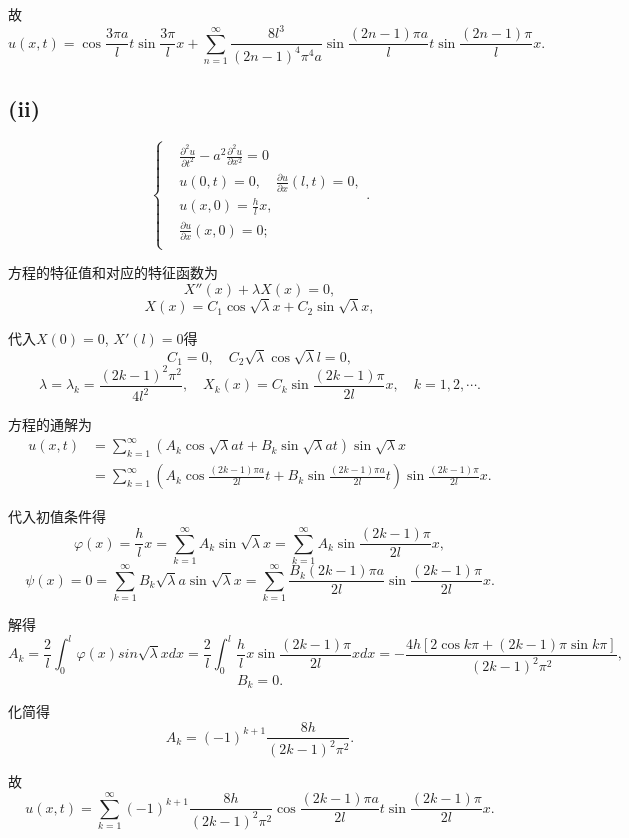 \documentclass[11pt,a4paper]{article}
\begin{document}
故
$$u(x,t)=\cos\frac{3\pi a}{l}t\sin\frac{3\pi}{l}x+\sum_{n=1}^\infty\frac{8l^3}{(2n-1)^4\pi^4a}\sin\frac{(2n-1)\pi a}{l}t\sin\frac{(2n-1)\pi}{l}x.$$

\subsection*{(ii)}

$$
  \left\{\begin{aligned}
     & \frac{\partial^2u}{\partial t^2}-a^2\frac{\partial^2u}{\partial x^2}=0 \\
     & u(0,t)=0,\quad \frac{\partial u}{\partial x}(l,t)=0,                   \\
     & u(x,0)=\frac{h}{l}x,                                                   \\
     & \frac{\partial u}{\partial x}(x,0)=0;                                  \\
  \end{aligned}\right..
$$

方程的特征值和对应的特征函数为
$$X''(x)+\lambda X(x)=0,$$
$$X(x)=C_1\cos\sqrt{\lambda}x+C_2\sin\sqrt{\lambda}x,$$

代入$X(0)=0$, $X'(l)=0$得
$$C_1=0,\quad C_2\sqrt{\lambda}\cos\sqrt{\lambda}l=0,$$
$$\lambda=\lambda_k=\frac{(2k-1)^2\pi^2}{4l^2},\quad X_k(x)=C_k\sin\frac{(2k-1)\pi}{2l}x,\quad k=1,2,\cdots.$$

方程的通解为
\begin{align*}
  u(x,t)
   & =\sum_{k=1}^\infty\left(A_k\cos\sqrt{\lambda}at+
  B_k\sin\sqrt{\lambda}at\right)\sin\sqrt{\lambda}x          \\
   & =\sum_{k=1}^\infty\left(A_k\cos\frac{(2k-1)\pi a}{2l}t+
  B_k\sin\frac{(2k-1)\pi a}{2l}t\right)\sin\frac{(2k-1)\pi}{2l}x.
\end{align*}

代入初值条件得
$$\varphi(x)=\frac{h}{l}x=\sum_{k=1}^\infty A_k\sin\sqrt{\lambda}x=\sum_{k=1}^\infty A_k\sin\frac{(2k-1)\pi }{2l}x,$$
$$\psi(x)=0=\sum_{k=1}^\infty B_k\sqrt{\lambda}a\sin\sqrt{\lambda}x=\sum_{k=1}^\infty \frac{B_k(2k-1)\pi a}{2l}\sin\frac{(2k-1)\pi}{2l}x.$$

解得
$$A_k=\frac{2}{l}\int_0^l\varphi(x)sin\sqrt{\lambda}xdx=\frac{2}{l}\int_0^l\frac{h}{l}x\sin\frac{(2k-1)\pi}{2l}xdx=-\frac{4h[2\cos k\pi+(2k-1)\pi\sin k\pi]}{(2k-1)^2\pi^2},$$
$$B_k=0.$$

化简得
$$A_k=(-1)^{k+1}\frac{8h}{(2k-1)^2\pi^2}.$$

故
$$u(x,t)=\sum_{k=1}^\infty (-1)^{k+1}\frac{8h}{(2k-1)^2\pi^2}\cos\frac{(2k-1)\pi a}{2l}t\sin\frac{(2k-1)\pi}{2l}x.$$
\end{document}
